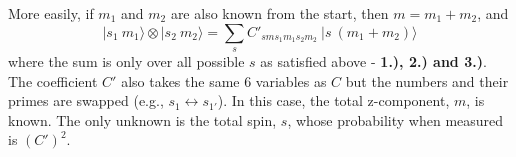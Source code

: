 \documentclass[12pt]{article}
\begin{document}

\vspace{20pt} 
    More easily, if \(m_1\) and \(m_2\) are also known from the start, then \(m = m_1 + m_2\), and
\[ \boxed{ | s_1 \ m_1 \rangle \otimes | s_2 \ m_2 \rangle 
    = \sum_s C'_{sms_{1}m_{1}s_{2}m_{2}} \ | s \ {\scriptstyle (m_1+m_2)} \rangle} \]
where the sum is only over all possible \(s\) as satisfied above - \textbf{1.), 2.) and 3.)}.
The coefficient \(C'\) also takes the same 6 variables as \(C\) but the numbers 
and their primes are swapped (e.g., \(s_1 \leftrightarrow s_{1'}\)).
In this case, the total z-component, \(m\), is known. The only unknown is the total spin, \(s\), 
whose probability when measured is \((C')^2\).
\end{document}

